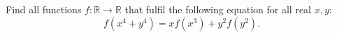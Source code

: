 Find all functions $f\colon\mathbb{R} \to \mathbb{R}$ that fulfil the following
equation for all real $x,y$:
$$f(x^4+y^4)=xf(x^3)+y^2f(y^2).$$
